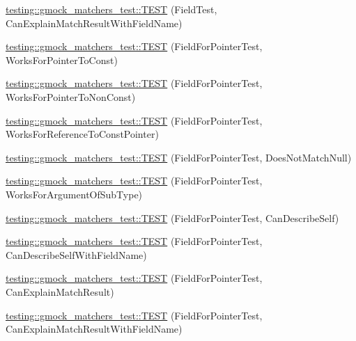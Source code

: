 \begin{DoxyCompactItemize}
\item 
\mbox{\hyperlink{namespacetesting_1_1gmock__matchers__test_aaeb4a7641ecabdb39710c56321000e47}{testing\+::gmock\+\_\+matchers\+\_\+test\+::\+T\+E\+ST}} (Field\+Test, Can\+Explain\+Match\+Result\+With\+Field\+Name)
\item 
\mbox{\hyperlink{namespacetesting_1_1gmock__matchers__test_af5c12cdd12f8778074ad0714b83858ed}{testing\+::gmock\+\_\+matchers\+\_\+test\+::\+T\+E\+ST}} (Field\+For\+Pointer\+Test, Works\+For\+Pointer\+To\+Const)
\item 
\mbox{\hyperlink{namespacetesting_1_1gmock__matchers__test_ac339a26bf6100a2eb2dd4bf908f8448c}{testing\+::gmock\+\_\+matchers\+\_\+test\+::\+T\+E\+ST}} (Field\+For\+Pointer\+Test, Works\+For\+Pointer\+To\+Non\+Const)
\item 
\mbox{\hyperlink{namespacetesting_1_1gmock__matchers__test_a603253edc7a2310c8a1db225cb589a99}{testing\+::gmock\+\_\+matchers\+\_\+test\+::\+T\+E\+ST}} (Field\+For\+Pointer\+Test, Works\+For\+Reference\+To\+Const\+Pointer)
\item 
\mbox{\hyperlink{namespacetesting_1_1gmock__matchers__test_a06a1c8d949707ab606627e9f6efe87b9}{testing\+::gmock\+\_\+matchers\+\_\+test\+::\+T\+E\+ST}} (Field\+For\+Pointer\+Test, Does\+Not\+Match\+Null)
\item 
\mbox{\hyperlink{namespacetesting_1_1gmock__matchers__test_a5447541a290e16a81aec6dd975983d57}{testing\+::gmock\+\_\+matchers\+\_\+test\+::\+T\+E\+ST}} (Field\+For\+Pointer\+Test, Works\+For\+Argument\+Of\+Sub\+Type)
\item 
\mbox{\hyperlink{namespacetesting_1_1gmock__matchers__test_a056670af8fc7bd3dfd170435dbf08c3c}{testing\+::gmock\+\_\+matchers\+\_\+test\+::\+T\+E\+ST}} (Field\+For\+Pointer\+Test, Can\+Describe\+Self)
\item 
\mbox{\hyperlink{namespacetesting_1_1gmock__matchers__test_ac1ff62c6b02c5267c3437c72f62bc8c7}{testing\+::gmock\+\_\+matchers\+\_\+test\+::\+T\+E\+ST}} (Field\+For\+Pointer\+Test, Can\+Describe\+Self\+With\+Field\+Name)
\item 
\mbox{\hyperlink{namespacetesting_1_1gmock__matchers__test_a6a4ffd283f91f4e085aa582aedefe38e}{testing\+::gmock\+\_\+matchers\+\_\+test\+::\+T\+E\+ST}} (Field\+For\+Pointer\+Test, Can\+Explain\+Match\+Result)
\item 
\mbox{\hyperlink{namespacetesting_1_1gmock__matchers__test_a1f0a8f314a858edb7144d2af8e8bdb66}{testing\+::gmock\+\_\+matchers\+\_\+test\+::\+T\+E\+ST}} (Field\+For\+Pointer\+Test, Can\+Explain\+Match\+Result\+With\+Field\+Name)

\end{DoxyCompactItemize}
